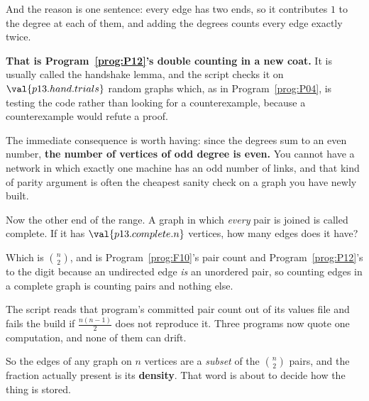 \begin{fr}
And the reason is one sentence: every edge has two ends, so it contributes $1$
to the degree at each of them, and adding the degrees counts every edge
exactly twice.

\textbf{That is Program~\ref{prog:P12}'s double counting in a new coat.} It is
usually called the handshake lemma, and the script checks it on
$\val{p13.hand.trials}$ random graphs \dash{} which, as in
Program~\ref{prog:P04}, is testing the code rather than looking for a
counterexample, because a counterexample would refute a proof.

\begin{note}
The immediate consequence is worth having: since the degrees sum to an even
number, \textbf{the number of vertices of odd degree is even.} You cannot have
a network in which exactly one machine has an odd number of links, and that
kind of parity argument is often the cheapest sanity check on a graph you have
newly built.
\end{note}
\end{fr}

\begin{fr}
Now the other end of the range. A graph in which \emph{every} pair is joined
is called complete. If it has $\val{p13.complete.n}$ vertices, how many edges
does it have?
\nextframe
\end{fr}

\begin{fr}
Which is $\binom{n}{2}$, and is Program~\ref{prog:F10}'s pair count and
Program~\ref{prog:P12}'s to the digit \dash{} because an undirected edge
\emph{is} an unordered pair, so counting edges in a complete graph is counting
pairs and nothing else.

\begin{note}
The script reads that program's committed pair count out of its values file
and fails the build if $\frac{n(n-1)}{2}$ does not reproduce it. Three
programs now quote one computation, and none of them can drift.
\end{note}

So the edges of any graph on $n$ vertices are a \emph{subset} of the
$\binom{n}{2}$ pairs, and the fraction actually present is its
\textbf{density}. That word is about to decide how the thing is stored.
\end{fr}

